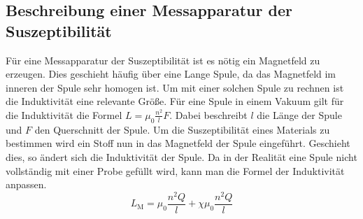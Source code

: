 \subsection{Beschreibung einer Messapparatur der Suszeptibilität}
\label{subsec:Messapparatur}
Für eine Messapparatur der Suszeptibilität ist es nötig ein Magnetfeld zu erzeugen. Dies geschieht häufig über eine Lange Spule, da das Magnetfeld im inneren der Spule sehr 
homogen ist. Um mit einer solchen Spule zu rechnen ist die Induktivität eine relevante Größe.
Für eine Spule in einem Vakuum gilt für die Induktivität die Formel $L = \mu_0 \frac{n^2}{l}F$. Dabei beschreibt $l$ die Länge der Spule und $F$ den Querschnitt der Spule.
Um die Suszeptibilität eines Materials zu bestimmen wird ein Stoff nun in das Magnetfeld der Spule eingeführt. Geschieht dies, so ändert sich die Induktivität der Spule. 
Da in der Realität eine Spule nicht vollständig mit einer Probe gefüllt wird, kann man die Formel der Induktivität anpassen.
\begin{equation}
    \label{eqn:L_M}
    L_{\text{M}} = \mu_0 \frac{n^2 Q}{l} + \chi \mu_0 \frac{n^2 Q}{l}
\end{equation} 

